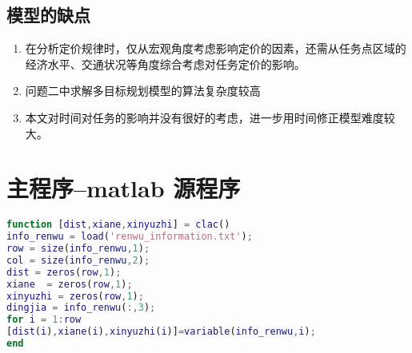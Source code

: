 \documentclass{cumcmthesis}
\begin{document}
\subsection{模型的缺点}
\begin{enumerate}
\item 在分析定价规律时，仅从宏观角度考虑影响定价的因素，还需从任务点区域的 经济水平、交通状况等角度综合考虑对任务定价的影响。 
\item 问题二中求解多目标规划模型的算法复杂度较高
\item 本文对时间对任务的影响并没有很好的考虑，进一步用时间修正模型难度较大。
\end{enumerate}







\newpage
\appendix
\section{主程序--matlab 源程序}
\begin{lstlisting}[language=matlab]
function [dist,xiane,xinyuzhi] = clac()
info_renwu = load('renwu_information.txt');
row = size(info_renwu,1);
col = size(info_renwu,2);
dist = zeros(row,1);
xiane  = zeros(row,1);
xinyuzhi = zeros(row,1);
dingjia = info_renwu(:,3);
for i = 1:row
[dist(i),xiane(i),xinyuzhi(i)]=variable(info_renwu,i); 
end

 \end{lstlisting}
\end{document}
